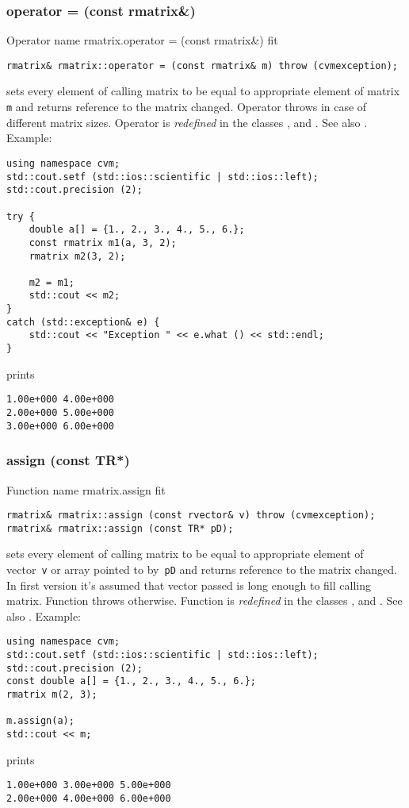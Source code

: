 \subsubsection{operator = (const rmatrix\&)}
Operator%
\pdfdest name {rmatrix.operator = (const rmatrix&)} fit
\begin{verbatim}
rmatrix& rmatrix::operator = (const rmatrix& m) throw (cvmexception);
\end{verbatim}
sets  every element of  calling matrix to be equal to
appropriate element of  matrix \verb"m"
and returns  reference to
the matrix changed.
Operator throws 
in case of different matrix sizes.
Operator is \emph{redefined} in  the classes
, 
and .
See also .
Example:
\begin{Verbatim}
using namespace cvm;
std::cout.setf (std::ios::scientific | std::ios::left);
std::cout.precision (2);

try {
    double a[] = {1., 2., 3., 4., 5., 6.};
    const rmatrix m1(a, 3, 2);
    rmatrix m2(3, 2);

    m2 = m1;
    std::cout << m2;
}
catch (std::exception& e) {
    std::cout << "Exception " << e.what () << std::endl;
}
\end{Verbatim}
prints
\begin{Verbatim}
1.00e+000 4.00e+000
2.00e+000 5.00e+000
3.00e+000 6.00e+000
\end{Verbatim}
\newpage



\subsubsection{assign (const TR*)}
Function%
\pdfdest name {rmatrix.assign} fit
\begin{verbatim}
rmatrix& rmatrix::assign (const rvector& v) throw (cvmexception);
rmatrix& rmatrix::assign (const TR* pD);
\end{verbatim}
sets every element of  calling matrix to be equal to
appropriate element of  vector~\verb'v'
or array pointed to by~\verb"pD"
and returns  reference to
the matrix changed.
In first version it's assumed that vector passed is long
enough to fill calling matrix. Function throws  
otherwise.
Function is \emph{redefined} in the classes
, 
and .
See also .
Example:
\begin{Verbatim}
using namespace cvm;
std::cout.setf (std::ios::scientific | std::ios::left);
std::cout.precision (2);
const double a[] = {1., 2., 3., 4., 5., 6.};
rmatrix m(2, 3);

m.assign(a);
std::cout << m;
\end{Verbatim}
prints
\begin{Verbatim}
1.00e+000 3.00e+000 5.00e+000
2.00e+000 4.00e+000 6.00e+000
\end{Verbatim}
\newpage



